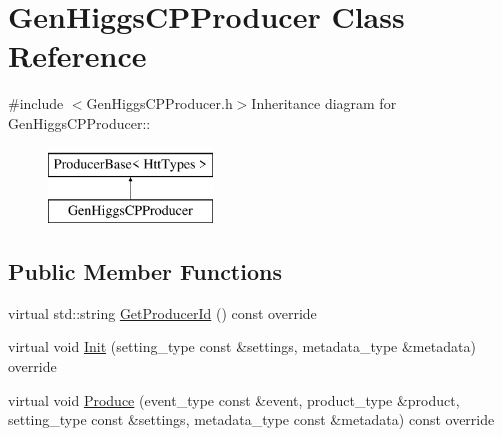 \hypertarget{classGenHiggsCPProducer}{
\section{GenHiggsCPProducer Class Reference}
\label{classGenHiggsCPProducer}
}


{\ttfamily \#include $<$GenHiggsCPProducer.h$>$}Inheritance diagram for GenHiggsCPProducer::\begin{figure}[H]
\begin{center}
\leavevmode
\includegraphics[height=2cm]{classGenHiggsCPProducer}
\end{center}
\end{figure}
\subsection*{Public Member Functions}
\begin{DoxyCompactItemize}
\item 
virtual std::string \hyperlink{classGenHiggsCPProducer_a3c3c147d611f380e3c7792e9270d077a}{GetProducerId} () const override
\item 
virtual void \hyperlink{classGenHiggsCPProducer_a2a9684adf876986504e04c14e559b6b6}{Init} (setting\_\-type const \&settings, metadata\_\-type \&metadata) override
\item 
virtual void \hyperlink{classGenHiggsCPProducer_ae1d7a6b1ae4a38f810ce8786bdf3d520}{Produce} (event\_\-type const \&event, product\_\-type \&product, setting\_\-type const \&settings, metadata\_\-type const \&metadata) const override
\end{DoxyCompactItemize}



